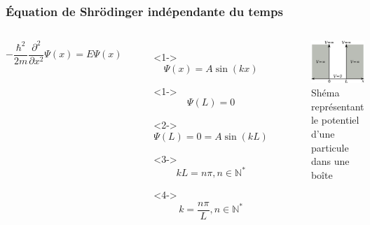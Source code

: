 \documentclass{beamer}
\begin{document}
\begin{frame}
\frametitle{Équation de Shrödinger indépendante du temps}

\begin{columns}

\begin{equation}\tag{4}
-\frac{\hbar^2}{2m}\frac{\partial^2}{\partial x^2}\Psi(x)=E\Psi(x)
\end{equation} 

\begin{itemize}
\item[]<1-> \begin{equation}\tag{5}
\Psi(x)=A\sin(kx)
\end{equation}  
\item[]<1-> \begin{equation}\tag{6}
\Psi(L)=0
\end{equation}
\item[]<2-> \begin{equation}\tag{7}
\Psi(L)=0=A\sin(kL)
\end{equation} 
\item[]<3-> \begin{equation}\tag{8}
kL=n\pi, n\in \mathbb{N}^*
\end{equation} 
\item[]<4-> \begin{equation}\tag{8}
k=\frac{n\pi}{L}, n\in \mathbb{N}^*
\end{equation} 
\end{itemize}
\begin{figure}
\includegraphics[scale=0.4]{Pot}
\caption{Shéma représentant le potentiel d'une particule dans une boîte}
\end{figure}
\end{columns}

\end{frame}
\end{document}
